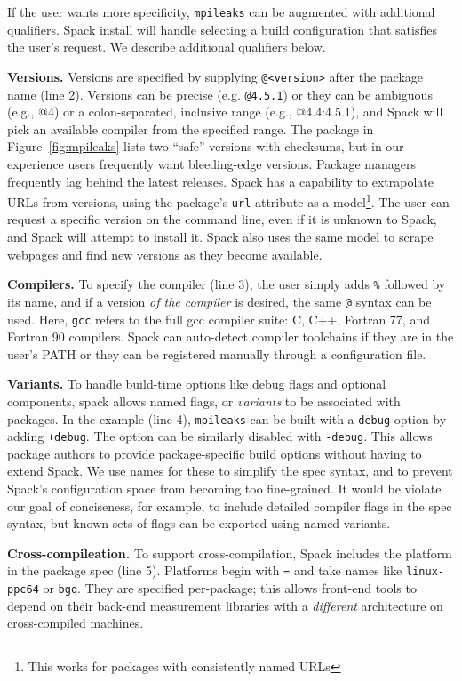 If the user wants more specificity, {\tt mpileaks} can be augmented with additional
qualifiers.  Spack install will handle selecting a build configuration that satisfies
the user's request.  We describe additional qualifiers below.

{\bf Versions.}
Versions are specified by supplying {\tt @<version>} after the package name (line 2). 
Versions can be precise (e.g. {\tt @4.5.1}) or 
they can be ambiguous (e.g., @4) or a colon-separated, inclusive range (e.g., @4.4:4.5.1),
and Spack will pick an available compiler from the specified range.
The package in Figure~\ref{fig:mpileaks} lists two ``safe'' versions with checksums, but
in our experience users frequently want bleeding-edge versions.  Package managers
frequently lag behind the latest releases. 
Spack has a capability to extrapolate URLs from versions,
using the package's {\tt url} attribute as a model\footnote{This works
for packages with consistently named URLs}.  The user can request a specific
version on the command line, even if it is unknown to Spack,
and Spack will attempt to install it.  Spack also uses the same
model to scrape webpages and find new versions as they become available.

{\bf Compilers.}
To specify the compiler (line 3), the user
simply adds {\tt \%} followed by its name, and if a version {\it of the compiler} 
is desired, the same {\tt @} syntax can be used.  Here, {\tt gcc} refers to the full
gcc compiler suite: C, C++, Fortran 77, and Fortran 90 compilers.  Spack can auto-detect
compiler toolchains if they are in the user's PATH or they can be registered manually
through a configuration file.

{\bf Variants.}
To handle build-time options like debug flags and optional components, spack
allows named flags, or {\it variants} to be associated with packages.  
In the example (line 4), {\tt mpileaks} can be built with a {\tt debug} option by
adding {\tt +debug}.  The option can be similarly disabled with {\tt -debug}.  
This allows package authors to provide package-specific build options without 
having to extend Spack.  We use names for these to simplify the spec
syntax, and to prevent Spack's configuration space from becoming too fine-grained.
It would be violate our goal of conciseness, for example, to include detailed 
compiler flags in the spec syntax, but known sets of flags can be exported using
named variants.

{\bf Cross-compileation.}
To support cross-compilation, Spack includes the platform in the package spec (line 5).
Platforms begin with {\tt =} and take names like {\tt linux-ppc64} or {\tt bgq}.  They are
specified per-package; this allows front-end tools to depend on their back-end measurement
libraries with a {\it different} architecture on cross-compiled machines.

